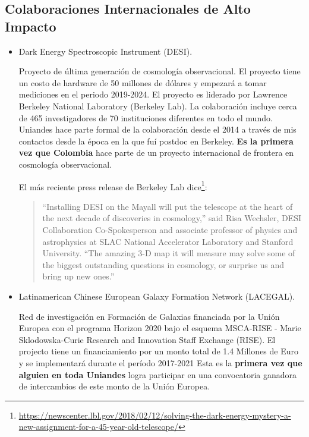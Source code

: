 \documentclass{article}
\begin{document}
\subsection{Colaboraciones Internacionales de Alto Impacto}

\begin{itemize}

\item Dark Energy Spectroscopic Instrument (DESI).

Proyecto de \'ultima generaci\'on de cosmolog\'ia observacional.
El proyecto tiene un costo de hardware de 50 millones de d\'olares y
empezar\'a a tomar mediciones en el periodo 2019-2024.
El proyecto es liderado por Lawrence Berkeley National Laboratory
(Berkeley Lab). 
La colaboraci\'on incluye cerca de 465 investigadores de 70
instituciones diferentes en todo el mundo.
Uniandes hace parte formal de la colaboraci\'on desde el 2014 a
trav\'es de mis contactos desde la \'epoca en la que fu\'i postdoc en
Berkeley. 
{\bf Es la primera vez que Colombia} hace parte de un proyecto internacional
de frontera en cosmolog\'ia observacional.


El m\'as reciente press release de Berkeley Lab
dice\footnote{\url{https://newscenter.lbl.gov/2018/02/12/solving-the-dark-energy-mystery-a-new-assignment-for-a-45-year-old-telescope/}}: 
\begin{quote}
“Installing DESI on the Mayall will put the telescope at the heart of
  the next decade of discoveries in cosmology,” said Risa Wechsler,
  DESI Collaboration Co-Spokesperson and associate professor of
  physics and astrophysics at SLAC National Accelerator Laboratory and
  Stanford University. “The amazing 3-D map it will measure may solve
  some of the biggest outstanding questions in cosmology, or surprise
  us and bring up new ones.” 
\end{quote}


\item Latinamerican Chinese European Galaxy Formation Network
  (LACEGAL). 

Red de investigaci\'on en Formaci\'on de Galaxias financiada por la
Uni\'on Europea con el programa Horizon 2020 bajo el esquema MSCA-RISE - Marie
Sklodowska-Curie Research and Innovation Staff Exchange (RISE). El
projecto tiene un financiamiento por un monto total de 1.4 Millones de
Euro y se implementar\'a durante el per\'iodo 2017-2021 
Esta es la {\bf primera vez que alguien en toda Uniandes} logra
participar en una convocatoria ganadora de intercambios de este monto
de la Uni\'on Europea.


\end{itemize}
\end{document}
